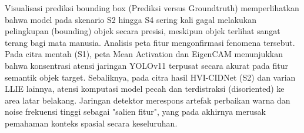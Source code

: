 \documentclass[conference]{IEEEtran}
\begin{document}
Visualisasi prediksi bounding box (Prediksi versus Groundtruth) memperlihatkan bahwa model pada skenario S2 hingga S4 sering kali gagal melakukan pelingkupan (bounding) objek secara presisi, meskipun objek terlihat sangat terang bagi mata manusia. Analisis peta fitur mengonfirmasi fenomena tersebut. Pada citra mentah (S1), peta Mean Activation dan EigenCAM menunjukkan bahwa konsentrasi atensi jaringan YOLOv11 terpusat secara akurat pada fitur semantik objek target. Sebaliknya, pada citra hasil HVI-CIDNet (S2) dan varian LLIE lainnya, atensi komputasi model pecah dan terdistraksi (disoriented) ke area latar belakang. Jaringan detektor merespons artefak perbaikan warna dan noise frekuensi tinggi sebagai "salien fitur", yang pada akhirnya merusak pemahaman konteks spasial secara keseluruhan.


\end{document}
